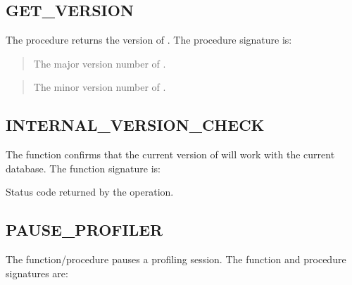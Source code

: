 \documentclass[letterpaper,10pt,english,openany,oneside]{sphinxmanual}
\begin{document}
\subsection{GET\_VERSION}
\label{\detokenize{dbms_profiler:get-version}}
The  procedure returns the version of . The
procedure signature is:



\begin{quote}

The major version number of .
\end{quote}

\begin{quote}

The minor version number of .
\end{quote}


\subsection{INTERNAL\_VERSION\_CHECK}
\label{\detokenize{dbms_profiler:internal-version-check}}
The  function confirms that the current version
of  will work with the current database. The function
signature is:
\begin{quote}

\end{quote}



Status code returned by the operation.


\subsection{PAUSE\_PROFILER}
\label{\detokenize{dbms_profiler:pause-profiler}}
The  function/procedure pauses a profiling session. The
function and procedure signatures are:
\begin{quote}


\end{quote}
\end{document}
